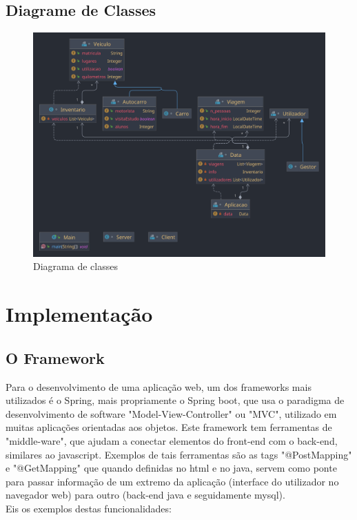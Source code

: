 \documentclass[11pt,a4paper]{report}%
\begin{document}
\section{Diagrame de Classes}
\begin{figure}[h!]
\centering
\includegraphics[scale=0.3]{Pictures/Diagrama1.png}
\caption{\label{fig:classes} Diagrama de classes}
\end{figure}







\chapter{Implementação}
\section{O Framework}

Para o desenvolvimento de uma aplicação web, um dos frameworks mais utilizados é o Spring, mais propriamente o Spring boot, que usa o paradigma de desenvolvimento de software "Model-View-Controller" ou "MVC", utilizado em muitas aplicações orientadas aos objetos. Este framework tem ferramentas de "middle-ware", que ajudam a conectar elementos do front-end com o back-end, similares ao javascript. Exemplos de tais ferramentas são as tags "@PostMapping" e "@GetMapping" que quando definidas no html e no java, servem como ponte para passar informação de um extremo da aplicação (interface do utilizador no navegador web) para outro (back-end java e seguidamente mysql). \\
Eis os exemplos destas funcionalidades:\\
\end{document}
